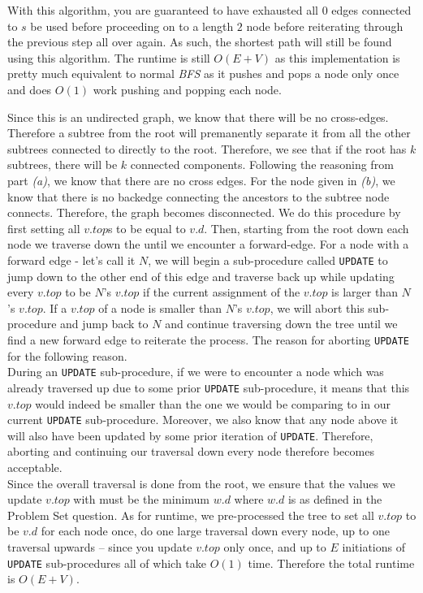 \documentclass[12pt,twoside]{article}
\begin{document}
\begin{problems}
With this algorithm, you are guaranteed to have exhausted all $0$ edges connected to $s$ be used before proceeding on to a length $2$ node before reiterating through the previous step all over again. As such, the shortest path will still be found using this algorithm. The runtime is still $O(E+V)$ as this implementation is pretty much equivalent to normal \emph{BFS} as it pushes and pops a node only once and does $O(1)$ work pushing and popping each node.
\problem  %
\begin{problemparts}
\problempart %
Since this is an undirected graph, we know that there will be no cross-edges. Therefore a subtree from the root will premanently separate it from all the other subtrees connected to directly to the root. Therefore, we see that if the root has $k$ subtrees, there will be $k$ connected components.
\problempart %
Following the reasoning from part \emph{(a)}, we know that there are no cross edges. For the node given in \emph{(b)}, we know that there is no backedge connecting the ancestors to the subtree node connects. Therefore, the graph becomes disconnected. 
\problempart %
We do this procedure by first setting all $v.top$s to be equal to $v.d$. Then, starting from the root down each node we traverse down the until we encounter a forward-edge. For a node with a forward edge - let's call it $N$, we will begin a sub-procedure called {\tt UPDATE} to jump down to the other end of this edge and traverse back up while updating every $v.top$ to be $N$'s $v.top$ if the current assignment of the $v.top$ is larger than $N$'s $v.top$. If a $v.top$ of a node is smaller than $N$'s $v.top$, we will abort this sub-procedure and jump back to $N$ and continue traversing down the tree until we find a new forward edge to reiterate the process. The reason for aborting {\tt UPDATE} for the following reason.\\
During an {\tt UPDATE} sub-procedure, if we were to encounter a node which was already traversed up due to some prior {\tt UPDATE} sub-procedure, it means that this $v.top$ would indeed be smaller than the one we would be comparing to in our current {\tt UPDATE} sub-procedure. Moreover, we also know that any node above it will also have been updated by some prior iteration of {\tt UPDATE}. Therefore, aborting and continuing our traversal down every node therefore becomes acceptable.\\
Since the overall traversal is done from the root, we ensure that the values we update $v.top$ with must be the minimum $w.d$ where $w.d$ is as defined in the Problem Set question. As for runtime, we pre-processed the tree to set all $v.top$ to be $v.d$ for each node once, do one large traversal down every node, up to one traversal upwards -- since you update $v.top$ only once, and up to $E$ initiations of {\tt UPDATE} sub-procedures all of which take $O(1)$ time. Therefore the total runtime is $O(E+V)$.

\end{problemparts}
\end{problems}
\end{document}
